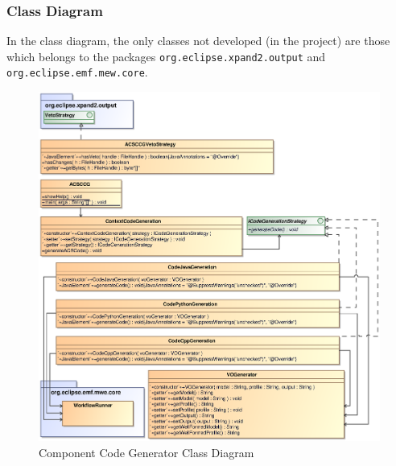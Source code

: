 \subsubsection{Class Diagram}
In the class diagram, the only classes not developed (in the project) are those
which belongs to the packages {\tt org.eclipse.xpand2.output}  and {\tt
org.eclipse.emf.mew.core}.\\ 
\begin{figure}[h!t]
\begin{center}
\includegraphics[scale=0.85]{images/ccgclassdiagram}
\caption{\label{fig:main_diag}Component Code Generator Class Diagram}
\end{center}
\end{figure}

\newpage

